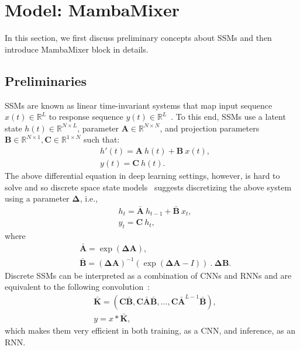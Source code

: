 \documentclass{article}
\newcommand{\R}[0]{\mathbb{R}}
\begin{document}
\section{Model: MambaMixer}
In this section, we first discuss preliminary concepts about SSMs and then introduce MambaMixer block in details.



\subsection{Preliminaries}
SSMs are known as linear time-invariant systems that map input sequence $x(t) \in \R^L$ to response sequence $y(t) \in \R^L$~\citep{aoki2013state}. To this end, SSMs use a latent state $h(t) \in \R^{N \times L}$, parameter $\mathbf{A}\in \R^{N\times N}$, and projection parameters $\mathbf{B} \in \R^{N\times 1}, \mathbf{C}\in \R^{1 \times N}$ such that:
\begin{align}\nonumber
    &h'(t) = \mathbf{A} \: h(t) + \mathbf{B} \: x(t), \\
    & y(t) = \mathbf{C} \: h(t).
\end{align}
The above differential equation in deep learning settings, however, is hard to solve and so discrete space state models~\citep{gu2020hippo, zhang2023effectively} suggests discretizing the above system using a parameter $\boldsymbol{\Delta}$, i.e.,
\begin{align}\nonumber
    &h_t = \bar{\mathbf{A}} \: h_{t-1} + \bar{\mathbf{B}} \: x_t,\\ \label{eq:ssm1}
    &y_t = \mathbf{C} \: h_t, 
\end{align}
where 
\begin{align}\nonumber
    &\bar{\mathbf{A}} = \exp\left( \boldsymbol{\Delta} \mathbf{A} \right),\\ \label{eq:ssm_disc}
    &\bar{\mathbf{B}} = \left( \boldsymbol{\Delta} \mathbf{A} \right)^{-1} \left( \exp \left( \boldsymbol{\Delta} \mathbf{A} - I \right) \right) \: . \: \boldsymbol{\Delta} \mathbf{B}.
\end{align}
Discrete SSMs can be interpreted as a combination of CNNs and RNNs and are equivalent to the following convolution~\citep{gu2020hippo}:
\begin{align}\nonumber
    &\bar{\mathbf{K}} = \left( {\mathbf{C}} \bar{\mathbf{B}}, {\mathbf{C}} \bar{\mathbf{A}} \bar{\mathbf{B}}, \dots, {\mathbf{C}} \bar{\mathbf{A}}^{L-1} \bar{\mathbf{B}} \right),\\ \label{eq:ssm_conv}
    &y = x \ast \bar{\mathbf{K}},
\end{align}
which makes them very efficient in both training, as a CNN, and inference, as an RNN.
\end{document}
